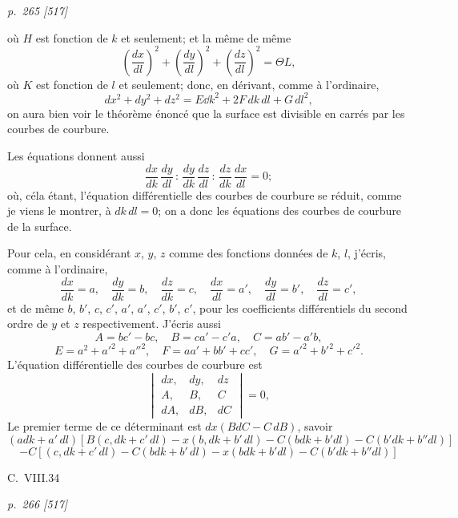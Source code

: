 \documentclass[11pt,a4paper]{book}
\begin{document}
\clearpage

\bigskip
\textit{p.~265 [517]}
\smallskip

\noindent
o\`u $H$ est fonction de $k$ et seulement; et la m\^eme de m\^eme
\[
\left(\frac{dx}{dl}\right)^2 + \left(\frac{dy}{dl}\right)^2 + \left(\frac{dz}{dl}\right)^2 = \Theta L,
\]
o\`u $K$ est fonction de $l$ et seulement; donc, en d\'erivant, comme \`a l'ordinaire,
\[
dx^2 + dy^2 + dz^2 = E\dd k^2 + 2F\,dk\,dl + G\,dl^2,
\]
on aura bien voir le th\'eor\`eme \'enonc\'e que la surface est divisible en carr\'es par les courbes
de courbure.

Les \'equations donnent aussi
\[
\frac{dx}{dk}\,\frac{dy}{dl} \, : \, \frac{dy}{dk}\,\frac{dz}{dl} \, : \, \frac{dz}{dk}\,\frac{dx}{dl} = 0;
\]
o\`u, c\'ela \'etant, l'\'equation diff\'erentielle des courbes de courbure se r\'eduit, comme je viens
le montrer, \`a $dk\,dl = 0$; on a donc les \'equations des courbes
de courbure de la surface.

Pour cela, en consid\'erant $x$, $y$, $z$ comme des fonctions donn\'ees de $k$, $l$, j'\'ecris,
comme \`a l'ordinaire,
\[
\frac{dx}{dk} = a, \quad \frac{dy}{dk} = b, \quad \frac{dz}{dk} = c, \quad \frac{dx}{dl} = a', \quad \frac{dy}{dl} = b', \quad \frac{dz}{dl} = c',
\]
et de m\^eme $b$, $b'$, $c$, $c'$, $a'$, $a'$, $c'$, $b'$, $c'$, pour les coefficients diff\'erentiels du second ordre de $y$ et $z$
respectivement.  J'\'ecris aussi
\[
A = bc' - bc, \quad B = ca' - c'a, \quad C = ab' - a'b,
\]
\[
E = a^2 + a'^2 + a''^2, \quad F = a a' + b b' + cc', \quad G = a'^2 + b'^2 + c'^2.
\]
L'\'equation diff\'erentielle des courbes de courbure est
\[
\begin{vmatrix}
dx, & dy, & dz \\
A, & B, & C \\
dA, & dB, & dC
\end{vmatrix} = 0,
\]
Le premier terme de ce d\'eterminant est $dx(BdC - C\, dB)$, savoir
\[
(adk + a'\,dl)\!\left[B(c, dk + c'\,dl) - x(b, dk + b'\,dl) - C(b dk + b'dl) - C(b' dk + b''dl)\right]
\]
\[
- C[(c, dk + c'\,dl) - C(b dk + b'\,dl) - x(b dk + b' dl) - C(b' dk + b'' dl)]
\]

C.\ VIII.\hfill 34

\clearpage

\bigskip
\textit{p.~266 [517]}
\smallskip
\end{document}
